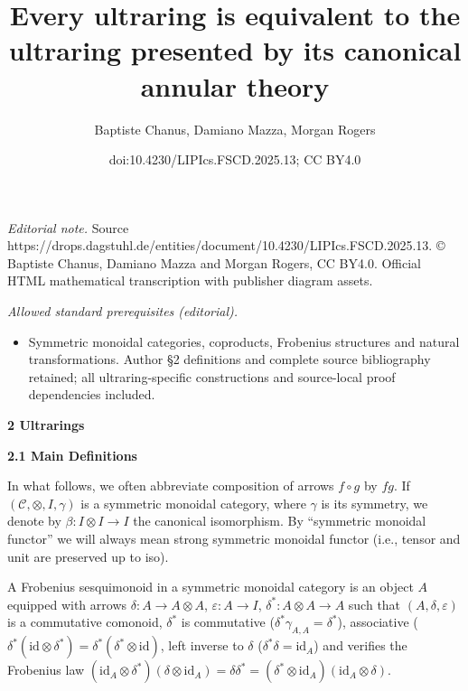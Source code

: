 \documentclass[10pt,a4paper]{amsart}
\title{Every ultraring is equivalent to the ultraring presented by its canonical annular theory}
\author{Baptiste Chanus, Damiano Mazza, Morgan Rogers}
\date{doi:10.4230/LIPIcs.FSCD.2025.13; CC BY4.0}
\begin{document}
\maketitle
\noindent\textit{Editorial note.} Source https://drops.dagstuhl.de/entities/document/10.4230/LIPIcs.FSCD.2025.13. © Baptiste Chanus, Damiano Mazza and Morgan Rogers, CC BY4.0. Official HTML mathematical transcription with publisher diagram assets.\par\medskip
\noindent\textit{Allowed standard prerequisites (editorial).}\begin{itemize}
\item Symmetric monoidal categories, coproducts, Frobenius structures and natural transformations. Author §2 definitions and complete source bibliography retained; all ultraring-specific constructions and source-local proof dependencies included.
\end{itemize}\medskip
 
\par\medskip\noindent\textbf{2 Ultrarings}\par
 
 
\par\medskip\noindent\textbf{2.1 Main Definitions}\par
 
 
In what follows, we often abbreviate composition of arrows $f\circ g$ by $fg$. If $(\mathcal{C},\otimes,I,\gamma)$ is a symmetric monoidal category, where $\gamma$ is its symmetry, we denote by $\beta:I\otimes I\to I$ the canonical isomorphism. By “symmetric monoidal functor” we will always mean strong symmetric monoidal functor (i.e., tensor and unit are preserved up to iso).\par
 
 
 
A Frobenius sesquimonoid in a symmetric monoidal category is an object $A$ equipped with arrows $\delta:A\to A\otimes A$, $\varepsilon:A\to I$, $\delta^{\ast}:A\otimes A\to A$ such that $(A,\delta,\varepsilon)$ is a commutative comonoid, $\delta^{\ast}$ is commutative ($\delta^{\ast}\gamma_{A,A}=\delta^{\ast}$), associative ($\delta^{\ast}(\mathrm{id}\otimes\delta^{\ast})=\delta^{\ast}(\delta^{\ast}%
\otimes\mathrm{id})$, left inverse to $\delta$ ($\delta^{\ast}\delta=\mathrm{id}_{A}$) and verifies the Frobenius law $(\mathrm{id}_{A}\otimes\delta^{\ast})(\delta\otimes\mathrm{id}_{A})=\delta%
\delta^{\ast}=(\delta^{\ast}\otimes\mathrm{id}_{A})(\mathrm{id}_{A}\otimes\delta)$.\par
 
\end{document}
